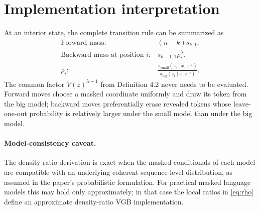 \documentclass[11pt]{article}
\newcommand{\pb}{\pi_{\mathrm{big}}}
\newcommand{\ps}{\pi_{\mathrm{small}}}
\begin{document}
\section{Implementation interpretation}

At an interior state, the complete transition rule can be summarized as
\begin{equation}
\boxed{
\begin{array}{ll}
\text{Forward mass:} & (n-k)s_{k,1},\\[3pt]
\text{Backward mass at position }i: & s_{k-1,1}\rho_i^\lambda,\\[3pt]
\rho_i: & \displaystyle\frac{\ps(z_i\mid x,z^{-i})}{\pb(z_i\mid x,z^{-i})}.
\end{array}}
\end{equation}
The common factor $V(z)^{\lambda+1}$ from Definition 4.2 never needs to be evaluated. Forward moves choose a masked coordinate uniformly and draw its token from the big model; backward moves preferentially erase revealed tokens whose leave-one-out probability is relatively larger under the small model than under the big model.

\paragraph{Model-consistency caveat.}
The density-ratio derivation is exact when the masked conditionals of each model are compatible with an underlying coherent sequence-level distribution, as assumed in the paper's probabilistic formulation. For practical masked language models this may hold only approximately; in that case the local ratios in \eqref{eq:rho} define an approximate density-ratio VGB implementation.
\end{document}

